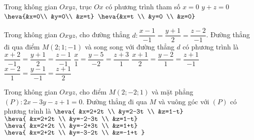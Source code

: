 \begin{ex}%
	Trong không gian $Oxyz$, trục $Ox$ có phương trình tham số
	\choice
	{$x=0$}
	{$y+z=0$}
	{$\heva{&x=0\\
			&y=0\\
			&z=t}$}
	{\True $\heva{&x=t \\
			&y=0 \\
			&z=0}$}
\end{ex}
\begin{ex}%
	Trong không gian $Oxyz$, cho đường thẳng $d\colon \dfrac{x-1}{-1}=\dfrac{y+1}{2}=\dfrac{z-2}{-1}$. Đường thẳng đi qua điểm $M(2; 1;-1)$ và song song với đường thẳng $d$ có phương trình là
	\choice
	{$\dfrac{x+2}{-1}=\dfrac{y+1}{2}=\dfrac{z-1}{-1}$}
	{\True $\dfrac{x}{1}=\dfrac{y-5}{-2}=\dfrac{z+3}{1}$}
	{$\dfrac{x+1}{2}=\dfrac{y-2}{1}=\dfrac{z+1}{-1}$}
	{$\dfrac{x-2}{1}=\dfrac{y-1}{-1}=\dfrac{z+1}{2}$}
\end{ex}
\begin{ex}%
	Trong không gian $Oxyz$, cho điểm $M(2;-2; 1)$ và mặt phẳng $(P)\colon 2x-3y-z+1=0$. Đường thẳng đi qua $M$ và vuông góc với $(P)$ có phương trình là
	\choice
	{$\heva{	&x=2+2t \\
			&y=2-3t \\
			&z=1-t}$}
	{\True $\heva{	&x=2+2t \\
			&y=-2-3t \\
			&z=1-t}$}
	{$\heva{	&x=2+2t \\
			&y=-2+3t \\
			&z=1+t}$}
	{$\heva{	&x=2+2t \\
			&y=-3-2t \\
			&z=-1+t	}$}
\end{ex}
